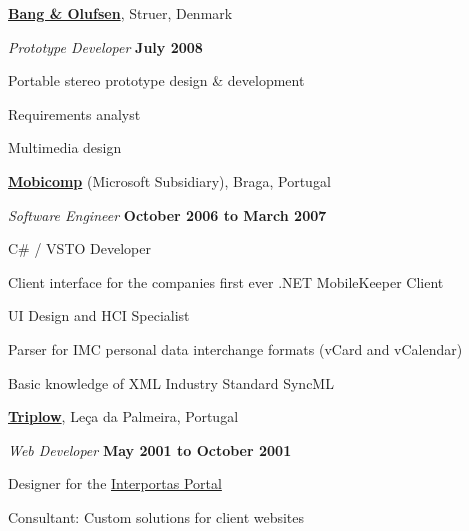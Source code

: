 \documentclass[10pt]{article}
\newenvironment{outerlist}[1][\enskip\textbullet]%
        {\begin{enumerate}[#1]}{\end{enumerate}%
         \vspace{-.6\baselineskip}}
\newenvironment{innerlist}[1][\enskip\textbullet]%
        {\begin{compactenum}[#1]}{\end{compactenum}}
\newcommand{\blankline}{\quad\pagebreak[2]}
\begin{document}
\blankline

\href{http://www.bang-olufsen.com}{\textbf{Bang \& Olufsen}}, 
Struer, Denmark
\begin{outerlist}

\item[] \textit{Prototype Developer}%
        \hfill \textbf{July 2008}
\begin{innerlist}
\item Portable stereo prototype design \& development 
\item Requirements analyst
\item Multimedia design

\end{innerlist}

\end{outerlist}

\blankline

\href{http://www.mobicomp.com/}{\textbf{Mobicomp}} (Microsoft Subsidiary), 
Braga, Portugal
\begin{outerlist}

\item[] \textit{Software Engineer}%
        \hfill \textbf{October 2006 to March 2007}
\begin{innerlist}
\item C\# / VSTO Developer
\item Client interface for the companies first ever .NET MobileKeeper Client
\item UI Design and HCI Specialist
\item Parser for IMC personal data interchange formats (vCard and vCalendar)
\item Basic knowledge of XML Industry Standard SyncML
\end{innerlist}

\end{outerlist}

\blankline

\textbf{\href{http://www.triplow.pt}{Triplow}}, 
Le\c ca da Palmeira, Portugal
\begin{outerlist}

\item[] \textit{Web Developer}%
        \hfill \textbf{May 2001 to October 2001}
\begin{innerlist}
  \item Designer for the \href{https://www.interportas.net}{Interportas Portal}
  \item Consultant: Custom solutions for client websites
\end{innerlist}

\end{outerlist}
\end{document}
